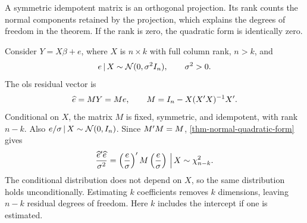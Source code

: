 \documentclass[a4paper,12pt]{article}
\begin{document}
\begin{remark}
	A symmetric idempotent matrix is an orthogonal projection.
	Its rank counts the normal components retained by the projection,
	which explains the degrees of freedom in the theorem.
	If the rank is zero, the quadratic form is identically zero.
\end{remark}

\begin{example}
	Consider $Y=X\beta+e$, where $X$ is $n\times k$ with full column rank, $n>k$, and
	\begin{align*}
		e\given X\sim\normaldistribution(0,\sigma^2I_n),\qquad \sigma^2>0.
	\end{align*}
	The \gls{ols} residual vector is
	\begin{align*}
		\widehat e=MY=Me,\qquad M=I_n-X(X\T X)\inv X\T.
	\end{align*}
	Conditional on $X$, the matrix $M$ is fixed, symmetric, and idempotent,
	with rank $n-k$. Also $e/\sigma\given X\sim\normaldistribution(0,I_n)$.
	Since $M\T M=M$, \autoref{thm-normal-quadratic-form} gives
	\begin{align}
		\frac{\widehat e\T\widehat e}{\sigma^2}
		=\left(\frac{e}{\sigma}\right)\T M\left(\frac{e}{\sigma}\right)
		\given[\Big] X\sim\chi_{n-k}^2.
	\end{align}
	The conditional distribution does not depend on $X$, so the same distribution holds unconditionally.
	Estimating $k$ coefficients removes $k$ dimensions, leaving $n-k$ residual degrees of freedom.
	Here $k$ includes the intercept if one is estimated.
\end{example}
\end{document}
